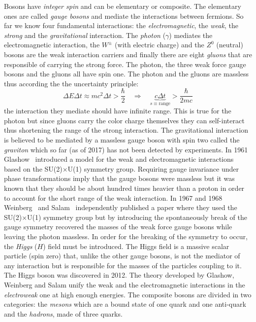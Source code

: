 Bosons have \emph{integer spin} and can be elementary or composite. The
elementary ones are called \emph{gauge bosons} and mediate the interactions
between fermions. So far we know four fundamental interactions: the
\emph{electromagnetic}, the \emph{weak}, the \emph{strong} and the
\emph{gravitational} interaction. The \emph{photon} ($\gamma$) mediates the
electromagnetic interaction, the $W^\pm$ (with electric charge) and the $Z^0$
(neutral) bosons are the weak interaction carriers and finally there are eight
\emph{gluons} that are responsible of carrying the strong force. The photon, the
three weak force gauge bosons and the gluons all have spin one. The photon and
the gluons are massless thus according the the uncertainty principle:
\begin{equation}
  \label{eq:149}
  \Delta E \Delta t \approx mc^2 \Delta t > \frac{\hbar}{2} \quad \Rightarrow \quad
  \underbrace{c \Delta t}_{s \equiv \mathrm{range}} > \frac{\hbar}{2mc}
\end{equation}
the interaction they mediate should have infinite range. This is true for the
photon but since gluons carry the color charge themselves they can self-interact
thus shortening the range of the strong interaction. The gravitational
interaction is believed to be mediated by a massless gauge boson with spin two
called the \emph{graviton} which so far (as of 2017) has not been detected by
experiments. In 1961 Glashow~\cite{GlashowPaper} introduced a model for the weak
and electromagnetic interactions based on the SU(2)$\times$U(1) symmetry
group. Requiring gauge invariance under phase transformations imply that the
gauge bosons were massless but it was known that they should be about hundred
times heavier than a proton in order to account for the short range of the weak
interaction. In 1967 and 1968 Weinberg~\cite{WeinbergPaper} and
Salam~\cite{SalamPaper} independently published a paper where they used the
SU(2)$\times$U(1) symmetry group but by introducing the spontaneously break of
the gauge symmetry recovered the masses of the weak force gauge bosons while
leaving the photon massless. In order for the breaking of the symmetry to occur,
the \emph{Higgs} ($H$) field must be introduced. The Higgs field is a massive
scalar particle (spin zero) that, unlike the other gauge bosons, is not the
mediator of any interaction but is responsible for the masses of the particles
coupling to it. The Higgs boson was discovered in 2012. The theory developed by
Glashow, Weinberg and Salam unify the weak and the electromagnetic interactions
in the \emph{electroweak} one at high enough energies. The composite bosons are
divided in two categories: the \emph{mesons} which are a bound state of one
quark and one anti-quark and the \emph{hadrons}, made of three quarks.


